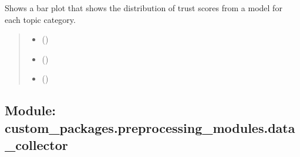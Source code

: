 \documentclass[letterpaper,10pt,english]{sphinxhowto}
\begin{document}
\begin{fulllineitems}
\label{\detokenize{_autosummary/custom_packages.misc_modules.visualisations.plot_sentiment_by_topic:custom_packages.misc_modules.visualisations.plot_sentiment_by_topic}}
\pysigstartsignatures
\pysiglinewithargsret
{}
{\sphinxparamcomma {}\sphinxparamcomma {}}
{}
\pysigstopsignatures
\sphinxAtStartPar
Shows a bar plot that shows the distribution of trust scores from a model for each topic category.
\begin{quote}\begin{description}
\begin{itemize}
\item {} 
\sphinxAtStartPar
{} ()

\item {} 
\sphinxAtStartPar
{} ()

\item {} 
\sphinxAtStartPar
{} ()

\end{itemize}

\sphinxAtStartPar
{}

\end{description}\end{quote}

\end{fulllineitems}


\sphinxstepscope


\subsection{Module: custom\_packages.preprocessing\_modules.data\_collector}
\label{\detokenize{preprocessing_modules:module-custom-packages-preprocessing-modules-data-collector}}\label{\detokenize{preprocessing_modules::doc}}
\end{document}
